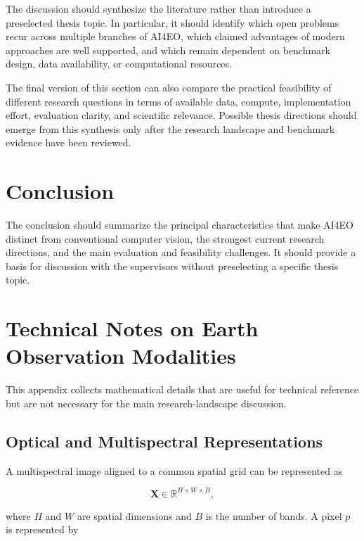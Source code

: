 \documentclass[11pt,a4paper]{article}
\begin{document}
The discussion should synthesize the literature rather than introduce a
preselected thesis topic. In particular, it should identify which open
problems recur across multiple branches of AI4EO, which claimed
advantages of modern approaches are well supported, and which remain
dependent on benchmark design, data availability, or computational
resources.

The final version of this section can also compare the practical
feasibility of different research questions in terms of available data,
compute, implementation effort, evaluation clarity, and scientific
relevance. Possible thesis directions should emerge from this synthesis
only after the research landscape and benchmark evidence have been
reviewed.

\section{Conclusion}

The conclusion should summarize the principal characteristics that make
AI4EO distinct from conventional computer vision, the strongest current
research directions, and the main evaluation and feasibility challenges.
It should provide a basis for discussion with the supervisors without
preselecting a specific thesis topic.


\appendix

\section{Technical Notes on Earth Observation Modalities}
\label{app:eo-technical}

This appendix collects mathematical details that are useful for technical
reference but are not necessary for the main research-landscape
discussion.

\subsection{Optical and Multispectral Representations}

A multispectral image aligned to a common spatial grid can be represented
as

\[
\mathbf{X}\in\mathbb{R}^{H\times W\times B},
\]

where \(H\) and \(W\) are spatial dimensions and \(B\) is the number of
bands. A pixel \(p\) is represented by
\end{document}
